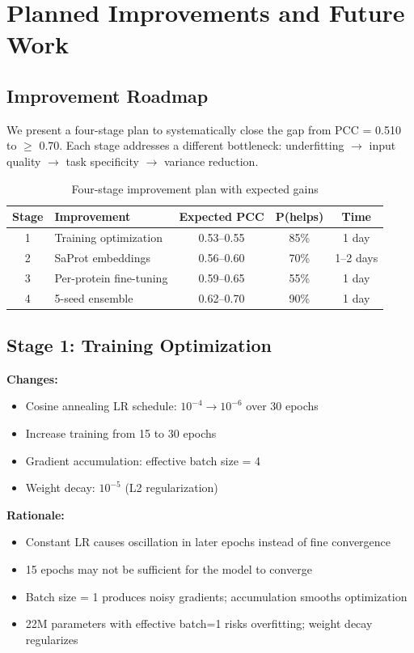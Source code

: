 \chapter{Planned Improvements and Future Work}
\label{ch:future_work}

\section{Improvement Roadmap}

We present a four-stage plan to systematically close the gap from PCC = 0.510 to $\geq$ 0.70. Each stage addresses a different bottleneck: underfitting $\rightarrow$ input quality $\rightarrow$ task specificity $\rightarrow$ variance reduction.

\begin{table}[h]
\centering
\caption{Four-stage improvement plan with expected gains}
\label{tab:roadmap}
\begin{tabular}{clccc}
\toprule
\textbf{Stage} & \textbf{Improvement} & \textbf{Expected PCC} & \textbf{P(helps)} & \textbf{Time} \\
\midrule
1 & Training optimization & 0.53--0.55 & 85\% & 1 day \\
2 & SaProt embeddings & 0.56--0.60 & 70\% & 1--2 days \\
3 & Per-protein fine-tuning & 0.59--0.65 & 55\% & 1 day \\
4 & 5-seed ensemble & 0.62--0.70 & 90\% & 1 day \\
\bottomrule
\end{tabular}
\end{table}

\section{Stage 1: Training Optimization}

\textbf{Changes:}
\begin{itemize}
    \item Cosine annealing LR schedule: $10^{-4} \rightarrow 10^{-6}$ over 30 epochs
    \item Increase training from 15 to 30 epochs
    \item Gradient accumulation: effective batch size = 4
    \item Weight decay: $10^{-5}$ (L2 regularization)
\end{itemize}

\textbf{Rationale:}
\begin{itemize}
    \item Constant LR causes oscillation in later epochs instead of fine convergence
    \item 15 epochs may not be sufficient for the model to converge
    \item Batch size = 1 produces noisy gradients; accumulation smooths optimization
    \item 22M parameters with effective batch=1 risks overfitting; weight decay regularizes
\end{itemize}


